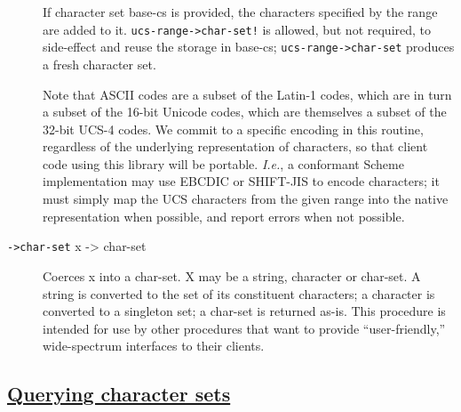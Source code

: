 \begin{description}
If character set base-cs is provided, the characters specified by the
range are added to it. \texttt{ucs-range-\textgreater{}char-set!} is
allowed, but not required, to side-effect and reuse the storage in
base-cs; \texttt{ucs-range-\textgreater{}char-set} produces a fresh
character set.

Note that ASCII codes are a subset of the Latin-1 codes, which are in
turn a subset of the 16-bit Unicode codes, which are themselves a subset
of the 32-bit UCS-4 codes. We commit to a specific encoding in this
routine, regardless of the underlying representation of characters, so
that client code using this library will be portable. \emph{I.e.}, a
conformant Scheme implementation may use EBCDIC or SHIFT-JIS to encode
characters; it must simply map the UCS characters from the given range
into the native representation when possible, and report errors when not
possible.
\item[ \href{}{} \texttt{-\textgreater{}char-set} x -\textgreater{}
char-set ]
Coerces x into a char-set. X may be a string, character or char-set. A
string is converted to the set of its constituent characters; a
character is converted to a singleton set; a char-set is returned as-is.
This procedure is intended for use by other procedures that want to
provide ``user-friendly,'' wide-spectrum interfaces to their clients.
\end{description}

\subsection{\texorpdfstring{\href{}{Querying character
sets}}{Querying character sets}}\label{querying-character-sets}

